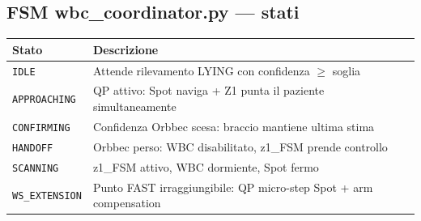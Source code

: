 \documentclass[a4paper,11pt]{article}
\begin{document}
\subsection*{FSM wbc\_coordinator.py — stati}

\begin{center}
\begin{tabular}{lp{9.5cm}}
\toprule
\textbf{Stato} & \textbf{Descrizione} \\
\midrule
\texttt{IDLE}         & Attende rilevamento LYING con confidenza $\geq$ soglia \\
\texttt{APPROACHING}  & QP attivo: Spot naviga + Z1 punta il paziente simultaneamente \\
\texttt{CONFIRMING}   & Confidenza Orbbec scesa: braccio mantiene ultima stima \\
\texttt{HANDOFF}      & Orbbec perso: WBC disabilitato, z1\_FSM prende controllo \\
\texttt{SCANNING}     & z1\_FSM attivo, WBC dormiente, Spot fermo \\
\texttt{WS\_EXTENSION}& Punto FAST irraggiungibile: QP micro-step Spot + arm compensation \\
\bottomrule
\end{tabular}
\end{center}
\end{document}
